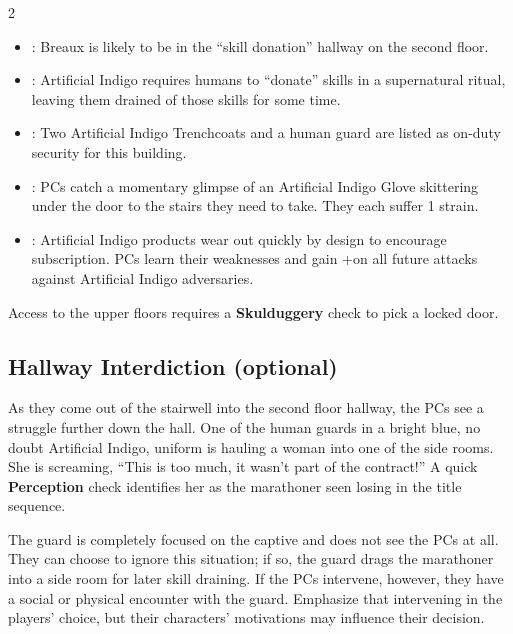 \documentclass{book}
\newcommand{\df}{\DifficultyDie }
\newcommand{\stb}{\SetbackDie }
\newcommand{\bbb}{\BoostDie }
\newcommand{\ai}{{\color{cyan}Artificial Indigo}\xspace}
\begin{document}
\begin{multicols*}{2}
\begin{itemize}
    \setlength\itemsep{-.5em}
    \item \Success: Breaux is likely to be in the ``skill donation'' hallway on the second floor.
    \item \Success: \ai requires humans to ``donate'' skills in a supernatural ritual, leaving them drained of those skills for some time.
    \item \Advantage\Advantage: Two \ai Trenchcoats and a human guard are listed as on-duty security for this building.
    \item \Threat\Threat: PCs catch a momentary glimpse of an \ai Glove skittering under the door to the stairs they need to take.  They each suffer 1 strain.
    \item \Triumph: \ai products wear out quickly by design to encourage subscription.  PCs learn their weaknesses and gain +\bbb on all future attacks against \ai adversaries.
\end{itemize}

  Access to the upper floors requires a \df\df\stb\stb \textbf{Skulduggery} check to pick a locked door.

\subsection{Hallway Interdiction (optional)}

As they come out of the stairwell into the second floor hallway, the PCs see a struggle further down the hall.  One of the human guards in a bright blue, no doubt \ai, uniform is hauling a woman into one of the side rooms.  She is screaming, ``This is too much, it wasn't part of the contract!''  A quick \df\df \textbf{Perception} check identifies her as the marathoner seen losing in the title sequence.

The guard is completely focused on the captive and does not see the PCs at all.  They can choose to ignore this situation; if so, the guard drags the marathoner into a side room for later skill draining.  If the PCs intervene, however, they have a social or physical encounter with the guard.  Emphasize that intervening in the players' choice, but their characters' motivations may influence their decision.


\end{multicols*}
\end{document}
